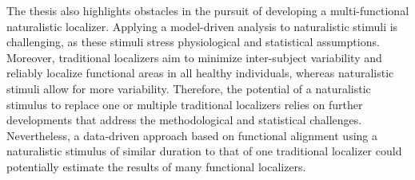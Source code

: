 The thesis also highlights obstacles in the pursuit of developing a
multi-functional naturalistic localizer.
%
Applying a model-driven analysis to naturalistic stimuli is challenging, as
these stimuli stress physiological and statistical assumptions.
%
Moreover, traditional localizers aim to minimize inter-subject variability and
reliably localize functional areas in all healthy individuals, whereas
naturalistic stimuli allow for more variability.
Therefore, the potential of a naturalistic stimulus to replace one or multiple
traditional localizers relies on further developments that address the
methodological and statistical challenges.
%
Nevertheless, a data-driven approach based on functional alignment using a
naturalistic stimulus of similar duration to that of one traditional localizer
could potentially estimate the results of many functional localizers.
